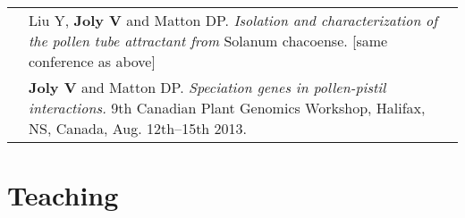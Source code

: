 \documentclass[letterpaper,10pt]{article}
\begin{document}
\begin{tabular}{r|p{15.1cm}}
& Liu Y, \textbf{Joly V} and Matton DP.
  \emph{Isolation and characterization of the pollen tube attractant from}
  Solanum chacoense. [same conference as above]
  \vspace{1.5mm} \\

& \textbf{Joly V} and Matton DP.
  \emph{Speciation genes in pollen-pistil interactions.}
  9th Canadian Plant Genomics Workshop, Halifax, NS, Canada,
  Aug. 12th--15th 2013.
  \\

\end{tabular}

\bigskip
\bigskip


\section{Teaching}
\end{document}
